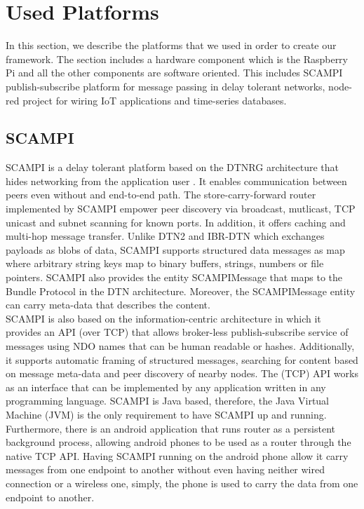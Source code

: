 \section{Used Platforms}
In this section, we describe the platforms that we used in order to create our framework. The section includes a hardware component which is the Raspberry Pi and all the other components are software oriented. This includes SCAMPI publish-subscribe platform for message passing in delay tolerant networks, node-red project for wiring IoT applications and time-series databases.
\newpage
\subsection{SCAMPI}
SCAMPI is a delay tolerant platform based on the DTNRG architecture that hides networking from the application user \cite{Karkkainen:2012:SAP:2348616.2348636}. It enables communication between peers even without and end-to-end path. The store-carry-forward router implemented by SCAMPI empower peer discovery via broadcast, mutlicast, TCP unicast  and subnet scanning for known ports. In addition, it offers caching and multi-hop message transfer. Unlike DTN2 and IBR-DTN which exchanges payloads as blobs of data, SCAMPI supports structured data messages as map where arbitrary string keys map to binary buffers, strings, numbers or file pointers. SCAMPI also provides the entity SCAMPIMessage that maps to the Bundle Protocol in the DTN architecture. Moreover, the SCAMPIMessage entity can carry meta-data that describes the content. \\

\noindent SCAMPI is also based on the information-centric architecture in which it provides an API (over TCP) that allows broker-less publish-subscribe service of messages using NDO names that can be human readable or hashes. Additionally, it supports automatic framing of structured messages, searching for content based on message meta-data and peer discovery of nearby nodes. The (TCP) API works as an interface that can be implemented by any application written in any programming language. SCAMPI is Java based, therefore, the Java Virtual Machine (JVM) is the only requirement to have SCAMPI up and running. Furthermore, there is an android application that runs router as a persistent background process, allowing android phones to be used as a router through the native TCP API. Having SCAMPI running on the android phone allow it carry messages from one endpoint to another without even having neither wired connection or a wireless one, simply, the phone is used to carry the data from one endpoint to another. \\

